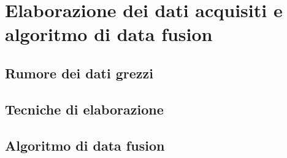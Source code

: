 \chapter{Elaborazione dei dati acquisiti e algoritmo di data fusion}
\label{elaborazione}
\section{Rumore dei dati grezzi}
\label{rumore}

\section{Tecniche di elaborazione}


\section{Algoritmo di data fusion}
\label{data_fusion}